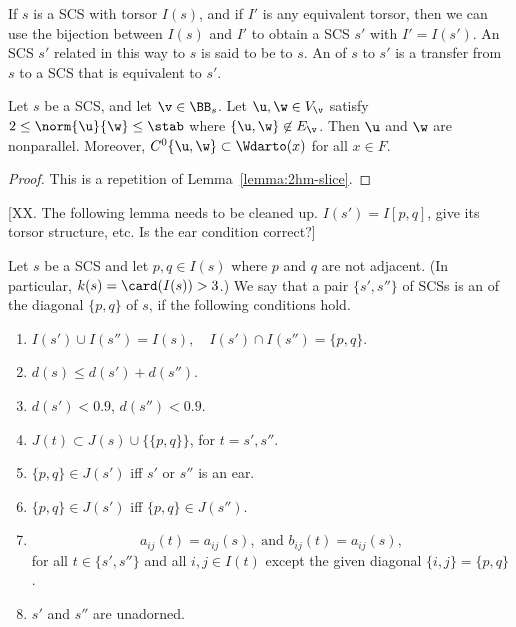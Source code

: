 If $s$ is a SCS with torsor $I(s)$, and if
$I'$ is any equivalent torsor, then we can use the bijection between $I(s)$ and $I'$
to obtain a SCS $s'$ with $I' = I(s')$.  An
SCS $s'$ related in this way to $s$ is said
to be  to $s$.  An  of $s$
to $s'$ is a transfer from $s$ to a SCS that
is equivalent to $s'$.

\begin{lemma}[]\label{lemma:2hm-slice1}
Let $s$ be a SCS, and let $\v\in \BB_s$.
Let $\u,\w\in V_\v$ satisfy $2\le\norm{\u}{\w}\le \stab$ where
$\{\u,\w\}\not\in E_\v$.  Then $\u$ and $\w$ are nonparallel.
Moreover,
$C^0\{\u,\w\}\subset \Wdarto(x)$ for all $x\in F$.
\end{lemma}


\begin{proof}  This is a repetition of Lemma~\ref{lemma:2hm-slice}.
\end{proof}


[XX.  The following lemma needs to be cleaned up.  $I(s') = I[p,q]$, give its
torsor structure, etc.
Is the ear condition correct?]

\begin{definition}[slice]
 Let $s$ be a SCS and let $p,q\in I(s)$ where $p$ and
  $q$ are not adjacent.  (In particular, $k(s)=\card(I(s))>3$.)  We
  say that a pair $\{s',s''\}$ of SCSs is an
 of  the
  diagonal $\{p,q\}$ of $s$, if the following conditions hold.
\begin{enumerate}
\item $I(s')\cup  I(s'') = I(s),\quad I(s')\cap I(s'') = \{p,q\}$.
\item $d(s) \le d(s') + d(s'')$.
\item $d(s') < 0.9$, $d(s'') < 0.9$.
\item $J(t) \subset J(s) \cup \{\{p,q\}\}$, for $t = s',s''$.  
\item $\{p,q\}\in J(s')$ iff $s'$ or $s''$ is an ear.
\item $\{p,q\}\in J(s')$ iff $\{p,q\}\in J(s'')$.
\item 
\[
a_{ij}(t) = a_{ij}(s), \text{ and } b_{ij}(t) = a_{ij}(s),
\]
for all $t\in \{s',s''\}$ and all $i,j\in I(t)$ except the given diagonal $\{i,j\} = \{p,q\}$.
\item  $s'$ and $s''$ are unadorned.
\end{enumerate}
\end{definition}


